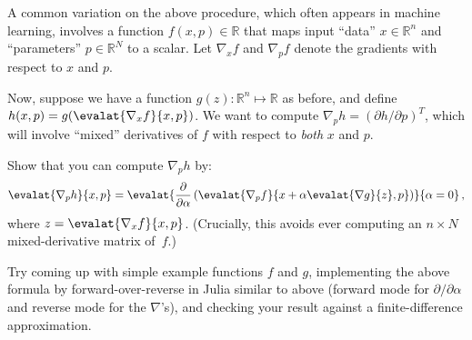 \begin{problem}
A common variation on the above procedure, which often appears in machine learning, involves a function $f(x,p) \in \mathbb{R}$ that maps input ``data'' $x \in \mathbb{R}^n$ and ``parameters'' $p \in \mathbb{R}^N$ to a scalar.  Let $\nabla_x f$ and $\nabla_p f$ denote the gradients with respect to $x$ and $p$.

Now, suppose we have a function $g(z): \mathbb{R}^n \mapsto \mathbb{R}$ as before, and define $h(x,p) = g(\evalat{\nabla_x f}{x,p})$.  We want to compute $\nabla_p h = (\partial h / \partial p)^T$, which will involve ``mixed'' derivatives of $f$ with respect to \emph{both} $x$ and $p$.

Show that you can compute $\nabla_p h$ by:
$$
\evalat{\nabla_p h}{x,p} =
\evalat{\frac{\partial}{\partial\alpha} \left( \evalat{\nabla_p f}{x + \alpha \evalat{\nabla g}{z},p}\right)}{\alpha = 0} \, ,
$$
where $z = \evalat{\nabla_x f}{x,p}$.  (Crucially, this avoids ever computing an $n \times N$ mixed-derivative matrix of~$f$.)

Try coming up with simple example functions $f$ and $g$, implementing the above formula by forward-over-reverse in Julia similar to above (forward mode for $\partial/\partial \alpha$ and reverse mode for the $\nabla$'s), and checking your result against a finite-difference approximation.
\end{problem}